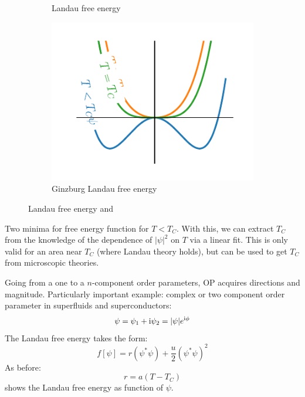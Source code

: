 \documentclass[../notes.tex]{subfiles}
\begin{document}
\begin{figure}[t]
	\centering
	\begin{subfigure}[b]{0.5\textwidth}
			\centering
			
			\caption{Landau free energy}
			\label{sfig:Landau free energy}
	\end{subfigure}%
	\begin{subfigure}[b]{0.5\textwidth}
		\centering
		\includegraphics[width=\textwidth]{images/landau_free_energy}
		\caption{Ginzburg Landau free energy}
		\label{sfig:Ginzburg Landau free energy}
	\end{subfigure}
	\caption{Landau free energy and} 
	\label{fig:Landau free energy and Ginzburg-Landau free energy}
\end{figure}

Two minima for free energy function for \(T < T_C\).
With this, we can extract \(T_C\) from the knowledge of the dependence of \(\vert \psi \vert^2\) on \(T\) via a linear fit.
This is only valid for an area near \(T_C\) (where Landau theory holds), but can be used to get \(T_C\) from microscopic theories.

Going from a one to a \(n\)-component order parameters, OP acquires directions and magnitude.
Particularly important example: complex or two component order parameter in superfluids and superconductors:
\begin{equation}
	\psi = \psi_1 + \mathrm{i} \psi_2 = \vert \psi \vert e^{\mathrm{i} \phi}
\end{equation}
The Landau free energy takes the form:
\begin{equation}
	f[\psi] = r(\psi^* \psi) + \frac{u}{2} (\psi^* \psi)^2
\end{equation}
As before:
\begin{equation}
	r = a(T - T_C)
\end{equation}
shows the Landau free energy as function of \(\psi\).
\end{document}
